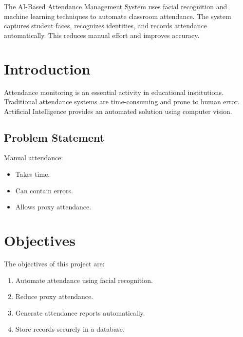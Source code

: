 \documentclass[12pt,a4paper]{report}
\begin{document}
	The AI-Based Attendance Management System uses facial recognition and machine learning techniques to automate classroom attendance. The system captures student faces, recognizes identities, and records attendance automatically. This reduces manual effort and improves accuracy.
	
	
	\tableofcontents
	\listoffigures
	\listoftables
	
	
	\chapter{Introduction}
	
	Attendance monitoring is an essential activity in educational institutions. Traditional attendance systems are time-consuming and prone to human error. Artificial Intelligence provides an automated solution using computer vision.
	
	\section{Problem Statement}
	
	Manual attendance:
	\begin{itemize}
		\item Takes time.
		\item Can contain errors.
		\item Allows proxy attendance.
	\end{itemize}
	
	
	\chapter{Objectives}
	
	The objectives of this project are:
	
	\begin{enumerate}
		\item Automate attendance using facial recognition.
		\item Reduce proxy attendance.
		\item Generate attendance reports automatically.
		\item Store records securely in a database.
	\end{enumerate}
	
\end{document}
